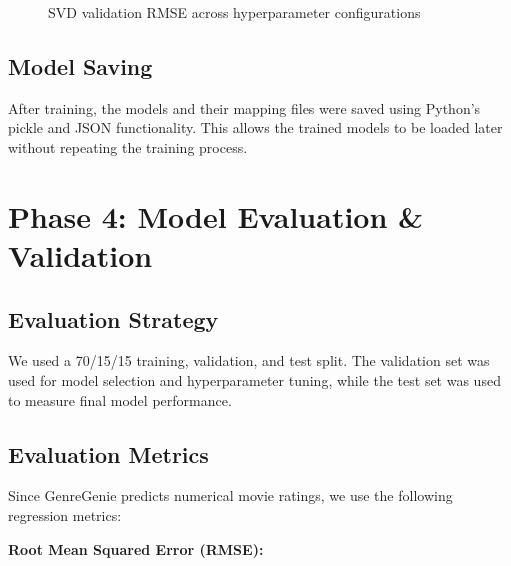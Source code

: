\documentclass[11pt,a4paper]{article}
\begin{document}
\begin{figure}[H]
\centering
{}
\caption{SVD validation RMSE across hyperparameter configurations}
\label{fig:svd_tuning_curve}
\end{figure}

\subsection{Model Saving}

After training, the models and their mapping files were saved
using Python's pickle and JSON functionality. This allows the
trained models to be loaded later without repeating the training
process.


\section{Phase 4: Model Evaluation \& Validation}

\subsection{Evaluation Strategy}

We used a 70/15/15 training, validation, and test split.
The validation set was used for model selection and
hyperparameter tuning, while the test set was used to measure
final model performance.

\subsection{Evaluation Metrics}

Since GenreGenie predicts numerical movie ratings, we use
the following regression metrics:

\textbf{Root Mean Squared Error (RMSE):}
\end{document}
